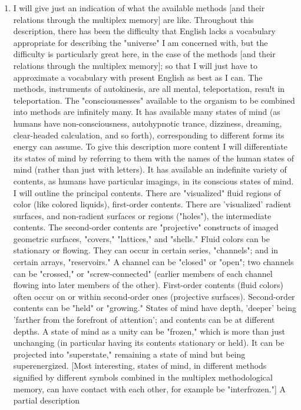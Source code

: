 \documentclass[10pt,twoside,draft]{memoir}
\begin{document}
{{\begin{enumerate}
\item I will give just an indication of what the available methods [and 
their relations through the multiplex memory] are like. Throughout this 
description, there has been the difficulty that English lacks a vocabulary 
appropriate for describing the "universe" I am concerned with, but the 
difficulty is particularly great here, in the case of the methods [and their 
relations through the multiplex memory]; so that I will just have to 
approximate a vocabulary with present English as best as I can. The 
methods, instruments of autokinesis, are all mental, teleportation, resu!t in 
teleportation. The "consciousnesses" available to the organism to be 
combined into methods are infinitely many. It has available many states of 
mind (as humans have non-consciousness, autohypnotic trance, dizziness, 
dreaming, clear-headed calculation, and so forth), corresponding to different 
forms its energy can assume. To give this description more content I will 
differentiate its states of mind by referring to them with the names of the 
human states of mind (rather than just with letters). It has available an 
indefinite variety of contents, as humans have particular imagings, in its 
conscious states of mind. I will outline the principal contents. There are 
"visualized" fluid regions of color (like colored liquids), first-order contents. 
There are 'visualized' radient surfaces, and non-radient surfaces or regions 
("holes"), the intermediate contents. The second-order contents are 
"projective" constructs of imaged geometric surfaces, "covers," "lattices," 
and "shells." Fluid colors can be stationary or flowing. They can occur in 
certain series, "channels"; and in certain arrays, "reservoirs." A channel can 
be "closed" or "open"; two channels can be "crossed," or 
"screw-connected" (earlier members of each channel flowing into later 
members of the other). First-order contents (fluid colors) often occur on or 
within second-order ones (projective surfaces). Second-order contents can be 
"held" or "growing." States of mind have depth, 'deeper' being 'farther from 
the forefront of attention'; and contents can be at different depths. A state 
of mind as a unity can be "frozen," which is more than just unchanging (in 
particular having its contents stationary or held). It can be projected into 
"superstate," remaining a state of mind but being superenergized. [Most 
interesting, states of mind, in different methods signified by different 
symbols combined in the multiplex methodological memory, can have 
contact with each other, for example be "interfrozen."] A partial description 

\end{enumerate}}}
\end{document}
